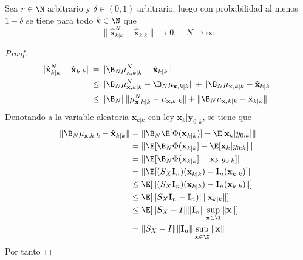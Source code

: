     \begin{cor}
	Sea $r \in \N$ arbitrario y $\delta \in (0, 1)$ arbitrario, luego con probabilidad al menos $1 - \delta$ se tiene para todo $k \in \N$ que 
	\begin{equation*}
		\| \hat{\mathbf{x}}^N_{k|k} - \hat{\mathbf{x}}_{k|k} \| \to 0, \quad N \to \infty
	\end{equation*}
\end{cor}
\begin{proof}
	\begin{equation*}
		\begin{aligned}
			\| \hat{\mathbf{x}}^N_{k|k} - \hat{\mathbf{x}}_{k|k} \| & = \| \B_N \mu_{\mathbf{x}, k|k}^N -  \hat{\mathbf{x}}_{k|k} \| \\
			& \leq \| \B_N \mu_{\mathbf{x}, k|k}^N -   \B_N \mu_{\mathbf{x}, k|k} \| + \|  \B_N \mu_{\mathbf{x}, k|k} - \hat{\mathbf{x}}_{k|k} \| \\
			& \leq \| \B_N \| \| \mu_{\mathbf{x}, k|k}^N - \mu_{\mathbf{x}, k|k}  \| + \|  \B_N \mu_{\mathbf{x}, k|k} - \hat{\mathbf{x}}_{k|k}  \|
		\end{aligned}
	\end{equation*}
	Denotando a la variable aleatoria $\mathbf{x}_{k|k}$ con ley $\mathbf{x}_k | \mathbf{y}_{0:k}$, se tiene que
	\begin{equation*}
		\begin{aligned}
			\|  \B_N \mu_{\mathbf{x}, k|k} - \hat{\mathbf{x}}_{k|k}  \| & = \| \B_N \E [\Phi (\mathbf{x}_{k|k})]  - \E[\mathbf{x}_k | y_{0:k}] \| \\
			& = \| \E [\B_N \Phi (\mathbf{x}_{k|k}]  - \E[\mathbf{x}_k | y_{0:k}] \| \\
			& = \| \E [\B_N \Phi (\mathbf{x}_{k|k}]  - \mathbf{x}_k | y_{0:k}] \| \\
			& = \| \E [(S_X \mathbf{I}_n)(\mathbf{x}_{k|k}) - \mathbf{I}_n (\mathbf{x}_{k|k})] \| \\
			& \leq \E [\| (S_X \mathbf{I}_n)(\mathbf{x}_{k|k}) - \mathbf{I}_n (\mathbf{x}_{k|k}) \|] \\
			& \leq \E [\| S_X \mathbf{I}_n - \mathbf{I}_n) \| \| \mathbf{x}_{k|k} \|] \\
			& \leq \E [ \| S_X - I \| \| \mathbf{I}_n \| \sup_{\mathbf{x} \in \X} \| \mathbf{x}  \| ] \\
			& = \| S_X - I \| \| \mathbf{I}_n \| \sup_{\mathbf{x} \in \X} \| \mathbf{x}  \| 
		\end{aligned}
	\end{equation*}
	Por tanto
\end{proof}

